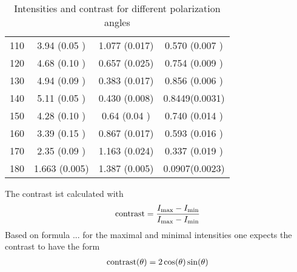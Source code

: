 \begin{table}[H]
\begin{tabular}{S[table-format=3.0] S S S[table-format=1.4(2)]}
		110                             & 3.94  (0.05 )              & 1.077 (0.017)              & 0.570 (0.007 ) \\
		120                             & 4.68  (0.10 )              & 0.657 (0.025)              & 0.754 (0.009 ) \\
		130                             & 4.94  (0.09 )              & 0.383 (0.017)              & 0.856 (0.006 ) \\
		140                             & 5.11  (0.05 )              & 0.430 (0.008)              & 0.8449(0.0031) \\
		150                             & 4.28  (0.10 )              & 0.64  (0.04 )              & 0.740 (0.014 ) \\
		160                             & 3.39  (0.15 )              & 0.867 (0.017)              & 0.593 (0.016 ) \\
		170                             & 2.35  (0.09 )              & 1.163 (0.024)              & 0.337 (0.019 ) \\
		180                             & 1.663 (0.005)              & 1.387 (0.005)              & 0.0907(0.0023) \\
		\bottomrule
	\end{tabular}
	\caption{Intensities and contrast for different polarization angles}
\end{table}

The contrast ist calculated with
\begin{align}
	\text{contrast} = \frac{I_\text{max} -I_\text{min}}{I_\text{max}-I_\text{min}}
\end{align}
Based on formula ... for the maximal and minimal intensities one expects the
contrast to have the form
\begin{align}
	\text{contrast}(\theta) = 2\cos(\theta)\sin(\theta)
\end{align}

